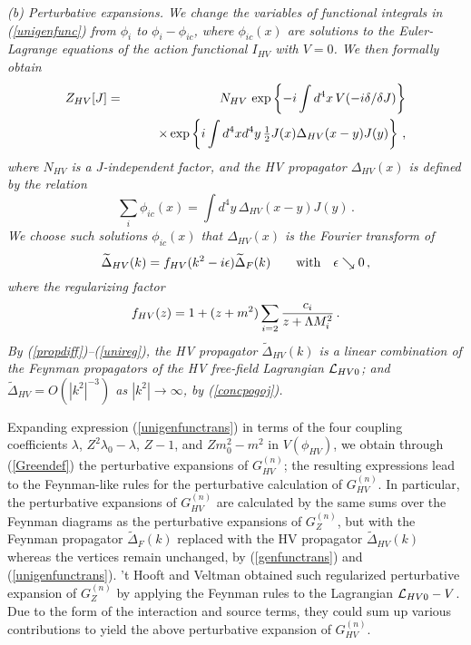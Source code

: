 \documentclass[a4paper,12pt]{article}
\newcommand{\half}{{\textstyle{1\over2}}}
\newcommand{\polje}{\phi}
\newcommand{\polR}{\polje_{HV}}
\newcommand{\akcija}{I}
\newcommand{\akcijaR}{\akcija_{HV}}
\newcommand{\Lag}{{\cal L}}
\newcommand{\Lagi}{V}
\newcommand{\LagRf}{\Lag_{HV0}}
\newcommand{\prop}{\widetilde{\Delta}}
\newcommand{\propF}{\prop_F}
\newcommand{\propR}{\prop_{HV}}
\newcommand{\unreg}{f_{HV}}
\newcommand{\Gf}{G^{(n)}}
\newcommand{\GfZ}{\Gf_Z}
\newcommand{\GfR}{\Gf_{HV}}
\begin{document}
\it (b) Perturbative expansions. \rm We change the variables of functional integrals in (\ref{unigenfunc}) from $\polje_i$ to $\polje_i - \polje_{ic}$, where $\polje_{ic}(x)$ are solutions to the Euler-Lagrange equations of the action functional $\akcijaR$ with $\Lagi = 0$. We then formally obtain
\begin{eqnarray}
   Z_{HV}[J] &=& N_{HV} \, \exp \left \{ -i \int d^4x \, \Lagi( -i\delta/ \delta J ) \right \} \nonumber\\
        & & \qquad\times  \exp \left \{ i \int d^4x d^4y \, \half J(x) \Delta_{HV}(x-y) J(y) \right \}  \,,
   \label{unigenfunctrans}
\end{eqnarray}
where $N_{HV}$ is a $J$-independent factor, and the \it HV propagator \rm $\Delta_{HV}(x)$ is defined by the relation
\begin{equation}
   \sum_i \polje_{ic}(x) = \int d^4y\, \Delta_{HV}(x-y) J(y) \,.
   \label{regpropdef}
\end{equation}
We choose such solutions $\polje_{ic}(x)$ that $\Delta_{HV}(x)$ is the Fourier transform of
\begin{equation}
   \propR(k) = \unreg(k^2 - i\epsilon) \propF(k) \qquad\hbox{with}\quad \epsilon \searrow 0 \,,
   \label{propdiff}
\end{equation}
where \it the regularizing factor \rm
\begin{equation}
   \unreg(z) =  1 + (z + m^2 ) \sum_{i=2} {c_i \over z + \Lambda M_i^2} \,.
   \label{unireg}
\end{equation}
By (\ref{propdiff})--(\ref{unireg}), the HV propagator $\propR(k)$ is a \it linear combination \rm of the Feynman propagators of the HV free-field Lagrangian $\LagRf$; and $\propR = O(|k^2|^{-3})$ as $|k^2| \to \infty$, by (\ref{concpogoj}).

Expanding expression (\ref{unigenfunctrans}) in terms of the four coupling coefficients $\lambda$, $Z^2\lambda_0 -\lambda$, $Z - 1$, and $Z m_0^2 - m^2$ in $\Lagi(\polR)$, we obtain through (\ref{Greendef}) the perturbative expansions of $\GfR$; the resulting expressions lead to the Feynman-like rules for the perturbative calculation of $\GfR$. In particular, the perturbative expansions of $\GfR$ are calculated by the same sums over the Feynman diagrams as the perturbative expansions of $\GfZ$, but with the Feynman propagator $\propF(k)$ replaced with the HV propagator $\propR(k)$ whereas the vertices remain unchanged, by (\ref{genfunctrans}) and (\ref{unigenfunctrans}). 't Hooft and Veltman \cite{Hooft} obtained such regularized perturbative expansion of $\GfZ$ by applying the Feynman rules to the Lagrangian  $\LagRf - \Lagi$. Due to the form of the interaction and source terms, they could sum up various contributions to yield the above perturbative expansion of $\GfR$.
\end{document}
